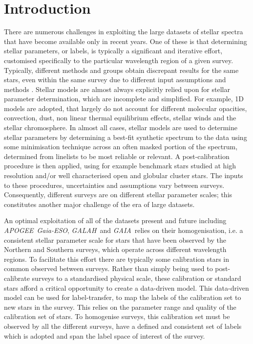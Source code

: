 \documentclass[12pt, preprint]{aastex}
\newcommand{\apogee}{\textsl{APOGEE}}
\newcommand{\galah}{\textsl{GALAH}}
\newcommand{\gaiaeso}{\textsl{Gaia-ESO}}
\newcommand{\gaia}{\textsl{GAIA}}
\begin{document}

\section{Introduction}

There are numerous challenges in exploiting the large datasets of stellar spectra that have become available only in recent years. One of these is that determining stellar parameters, or labels,  is typically a significant and iterative effort, customised specifically to the particular wavelength region of a given survey. Typically, different methods and groups obtain discrepant results for the same stars, even within the same survey due to different input assumptions and methods \citep[e.g.]{Sm2014}. Stellar models are almost always explicitly relied upon for stellar parameter determination, which are incomplete and simplified. For example, 1D models are adopted, that largely do not account for different molecular opacities, convection, dust, non linear thermal equilibrium effects, stellar winds and the stellar chromosphere. In almost all cases, stellar models are used to determine stellar parameters by determining a best-fit synthetic spectrum to the data using some minimisation technique across an often masked portion of the spectrum, determined from linelists to be most reliable or relevant. A post-calibration procedure is then applied, using for example benchmark stars studied at high resolution and/or well characterised open and globular cluster stars. The inputs to these procedures, uncertainties and assumptions vary between surveys. Consequently, different surveys are on different stellar parameter scales; this constitutes another major challenge of the era of large datasets. 

An optimal exploitation of all of the datasets present and future including \apogee\, \gaiaeso, \galah\ and \gaia\ relies on their homogenisation, i.e. a consistent stellar parameter scale for stars that have been observed by the Northern and Southern surveys, which operate across different wavelength regions. To facilitate this effort there are typically some calibration stars in common observed between surveys. Rather than simply being used to post-calibrate surveys to a standardised physical scale, these calibration or standard stars afford a critical opportunity to create a data-driven model.  This data-driven model can be used for label-transfer, to map the labels of the calibration set to new stars in the survey.  This relies on the parameter range and quality of the calibration set of stars. To homogenise surveys, this calibration set must be observed by all the different surveys, have a defined and consistent set of labels which is adopted and span the label space of interest of the survey. 
\end{document}
